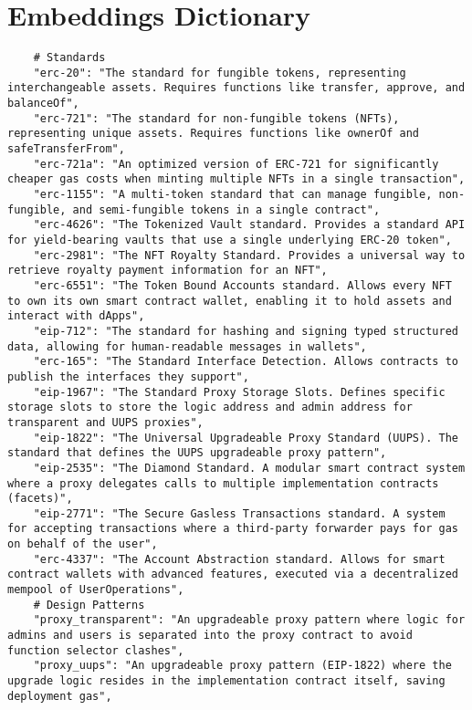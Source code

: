 \chapter{Embeddings Dictionary}
\label{appendix:embeddings-dictionary}

\begin{lstlisting}
    # Standards
    "erc-20": "The standard for fungible tokens, representing interchangeable assets. Requires functions like transfer, approve, and balanceOf",
    "erc-721": "The standard for non-fungible tokens (NFTs), representing unique assets. Requires functions like ownerOf and safeTransferFrom",
    "erc-721a": "An optimized version of ERC-721 for significantly cheaper gas costs when minting multiple NFTs in a single transaction",
    "erc-1155": "A multi-token standard that can manage fungible, non-fungible, and semi-fungible tokens in a single contract",
    "erc-4626": "The Tokenized Vault standard. Provides a standard API for yield-bearing vaults that use a single underlying ERC-20 token",
    "erc-2981": "The NFT Royalty Standard. Provides a universal way to retrieve royalty payment information for an NFT",
    "erc-6551": "The Token Bound Accounts standard. Allows every NFT to own its own smart contract wallet, enabling it to hold assets and interact with dApps",
    "eip-712": "The standard for hashing and signing typed structured data, allowing for human-readable messages in wallets",
    "erc-165": "The Standard Interface Detection. Allows contracts to publish the interfaces they support",
    "eip-1967": "The Standard Proxy Storage Slots. Defines specific storage slots to store the logic address and admin address for transparent and UUPS proxies",
    "eip-1822": "The Universal Upgradeable Proxy Standard (UUPS). The standard that defines the UUPS upgradeable proxy pattern",
    "eip-2535": "The Diamond Standard. A modular smart contract system where a proxy delegates calls to multiple implementation contracts (facets)",
    "eip-2771": "The Secure Gasless Transactions standard. A system for accepting transactions where a third-party forwarder pays for gas on behalf of the user",
    "erc-4337": "The Account Abstraction standard. Allows for smart contract wallets with advanced features, executed via a decentralized mempool of UserOperations",
    # Design Patterns
    "proxy_transparent": "An upgradeable proxy pattern where logic for admins and users is separated into the proxy contract to avoid function selector clashes",
    "proxy_uups": "An upgradeable proxy pattern (EIP-1822) where the upgrade logic resides in the implementation contract itself, saving deployment gas",

\end{lstlisting}
